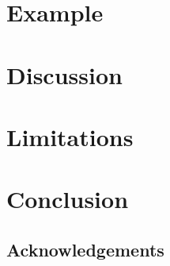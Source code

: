 \documentclass[acmlarge,review,anonymous]{acmart}\settopmatter{printfolios=true}
\begin{document}
\section{Example}
\label{sect.example}


\section{Discussion}
\label{sect.discussion}


\section{Limitations}
\label{sect.limitations}





\section{Conclusion}
\label{sect.conclusion}

\subsection*{Acknowledgements}

{}
\end{document}
